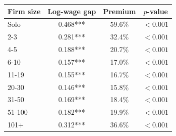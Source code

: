 \begin{tabular}{lccc}
\toprule
    Firm size & Log-wage gap & Premium & $p$-value \\
    \midrule
Solo & 0.468*** & 59.6\% & $<0.001$ \\
2-3 & 0.281*** & 32.4\% & $<0.001$ \\
4-5 & 0.188*** & 20.7\% & $<0.001$ \\
6-10 & 0.157*** & 17.0\% & $<0.001$ \\
11-19 & 0.155*** & 16.7\% & $<0.001$ \\
20-30 & 0.146*** & 15.8\% & $<0.001$ \\
31-50 & 0.169*** & 18.4\% & $<0.001$ \\
51-100 & 0.182*** & 19.9\% & $<0.001$ \\
101+ & 0.312*** & 36.6\% & $<0.001$\\
\bottomrule\end{tabular}

